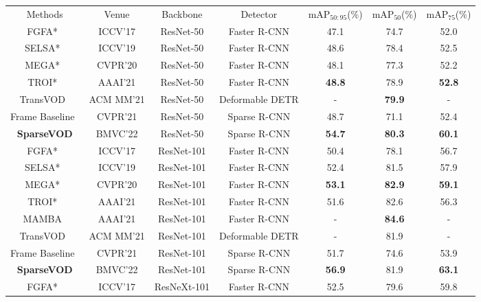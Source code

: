 \documentclass{bmvc2k}
\begin{document}
\begin{table}
\begin{center}
\scriptsize
\begin{tabular}{ccccccc}
\toprule
Methods & Venue & Backbone & Detector & mAP$_{50:95}$($\%$) & mAP$_{50}$($\%$)  &  mAP$_{75}$($\%$)\\
\noalign{\smallskip}
\hline
FGFA*~\cite{zhu2017flow}  & ICCV'17 & ResNet-50 & Faster R-CNN & 47.1 & 74.7 & 52.0 \\
SELSA*~\cite{wu2019sequence}  & ICCV'19 & ResNet-50 & Faster R-CNN & 48.6 & 78.4 & 52.5 \\
MEGA*~\cite{chen2020memory}  & CVPR'20 & ResNet-50 & Faster R-CNN & 48.1 & 77.3 & 52.2 \\
TROI*~\cite{gong2021temporal}  & AAAI'21 & ResNet-50 & Faster R-CNN & \textbf{\color{blue} 48.8}  & 78.9 & \textbf{\color{blue}52.8} \\
TransVOD~\cite{he2021end}  & ACM MM'21 & ResNet-50 & Deformable DETR& -  & \textbf{\color{blue}79.9} & - \\
\hline
{Frame Baseline~\cite{sun2021sparse}}& CVPR'21 & ResNet-50 & Sparse R-CNN &48.7 & 71.1 & 52.4 \\
{\textbf{SparseVOD} }& BMVC'22 & ResNet-50 & Sparse R-CNN & \textbf{\color{red}54.7} & \textbf{\color{red}80.3} & \textbf{\color{red}60.1} \\
\hline
FGFA*~\cite{zhu2017flow}  & ICCV'17 & ResNet-101 & Faster R-CNN & 50.4 & 78.1 & 56.7 \\
SELSA*~\cite{wu2019sequence}  & ICCV'19 & ResNet-101 & Faster R-CNN & 52.4 & 81.5 &  57.9 \\
MEGA*~\cite{chen2020memory}  & CVPR'20 & ResNet-101 & Faster R-CNN & \textbf{\color{blue}53.1}  & \textbf{\color{blue} 82.9} & \textbf{\color{blue}59.1}\\
TROI*~\cite{gong2021temporal}  & AAAI'21 & ResNet-101 & Faster R-CNN& 51.6  &   82.6 & 56.3 \\
MAMBA~\cite{sun2021mamba}  & AAAI'21 & ResNet-101 & Faster R-CNN& -  &  \textbf{\color{red} 84.6} & - \\
TransVOD~\cite{he2021end}  & ACM MM'21 & ResNet-101 & Deformable DETR & - &81.9 & - \\
\hline
{Frame Baseline~\cite{sun2021sparse}}& CVPR'21 & ResNet-101 & Sparse R-CNN & 51.7 & 74.6 & 53.9 \\
{\textbf{SparseVOD} }& BMVC'22 & ResNet-101 & Sparse R-CNN  & \textbf{\color{red}56.9} & 81.9 & \textbf{\color{red}63.1}\\
\hline
FGFA*~\cite{zhu2017flow}  & ICCV'17 & ResNeXt-101 & Faster R-CNN& 52.5  & 79.6 & 59.8 \\

\end{tabular}
\end{center}
\end{table}
\end{document}

